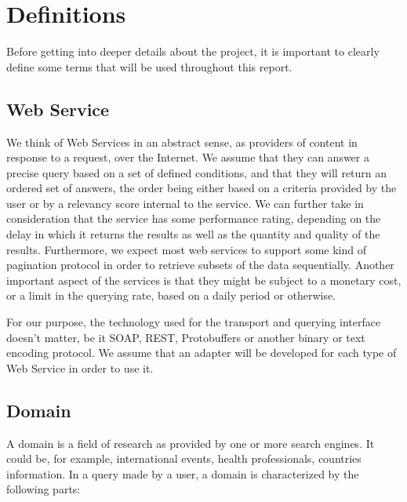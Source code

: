 
\section{Definitions} %
\label{sec:definitions}

Before getting into deeper details about the project, it is important to clearly define some terms that will be used throughout this report.

\subsection{Web Service} %
\label{sub:web_service_def}

We think of Web Services in an abstract sense, as providers of content in response to a request, over the Internet. We assume that they can answer a precise query based on a set of defined conditions, and that they will return an ordered set of answers, the order being either based on a criteria provided by the user or by a relevancy score internal to the service. We can further take in consideration that the service has some performance rating, depending on the delay in which it returns the results as well as the quantity and quality of the results. Furthermore, we expect most web services to support some kind of pagination protocol in order to retrieve subsets of the data sequentially. Another important aspect of the services is that they might be subject to a monetary cost, or a limit in the querying rate, based on a daily period or otherwise.

For our purpose, the technology used for the transport and querying interface doesn't matter, be it SOAP, REST, Protobuffers or another binary or text encoding protocol. We assume that an adapter will be developed for each type of Web Service in order to use it.


\subsection{Domain} %
\label{sub:domain_def}

A domain is a field of research as provided by one or more search engines. It could be, for example, international events, health professionals, countries information. In a query made by a user, a domain is characterized by the following parts:

